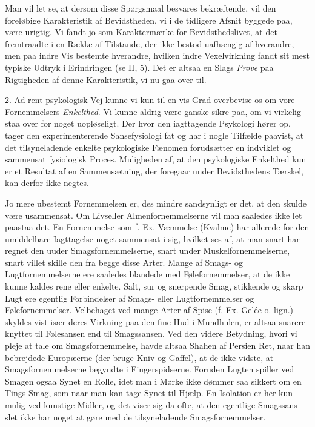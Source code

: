 \documentclass[12pt,a4paper,openany]{book}
\newcommand{\opage}[1]{\marginnote{\footnotesize\textit{[#1]}}}
\begin{document}
Man vil let se, at dersom disse Spørgsmaal besvares bekræftende, vil den
foreløbige Karakteristik af Bevidstheden, vi i de tidligere Afsnit
byggede paa, være urigtig. Vi fandt jo som Karaktermærke for
Bevidsthedslivet, at det fremtraadte i en Række af Tilstande, der ikke
bestod uafhængig af hverandre, men paa indre Vis bestemte hverandre,
hvilken indre Vexelvirkning fandt sit mest typiske Udtryk i Erindringen
(se II, 5). Det er altsaa en Slags \emph{Prøve} paa Rigtigheden af denne
Karakteristik, vi nu gaa over til.

2. Ad rent psykologisk Vej kunne vi kun til en vis Grad overbevise os om
vore Fornemmelsers \emph{Enkelthed}. Vi kunne aldrig være ganske sikre
paa, om vi virkelig staa over for noget uopløseligt. Der hvor den
iagttagende Psykologi hører op, tager den experimenterende
Sansefysiologi fat og har i nogle Tilfælde paavist, at det
tilsyneladende enkelte psykologiske Fænomen forudsætter en indviklet og
sammensat fysiologisk Proces. Muligheden af, at den psykologiske
Enkelthed kun er et Resultat af en Sammensætning, der foregaar under
Bevidsthedens Tærskel, kan derfor ikke negtes.

Jo mere ubestemt Fornemmelsen er, des mindre sandsynligt er det, at den
skulde være usammensat. Om Livseller Almenfornemmelserne vil man
saaledes ikke let paastaa det. En Fornemmelse som f. Ex. Væmmelse
(Kvalme) har allerede for den umiddelbare Iagttagelse noget sammensat i
\opage{122}sig, hvilket ses af, at man snart har regnet den uuder
Smagsfornemmelserne, snart under Muskelfornemmelserne, snart villet
skille den fra begge disse Arter. Mange af Smags- og Lugtfornemmelserne
ere saaledes blandede med Følefornemmelser, at de ikke kunne kaldes rene
eller enkelte. Salt, sur og snerpende Smag, stikkende og skarp Lugt ere
egentlig Forbindelser af Smags- eller Lugtfornemmelser og
Følefornemmelser. Velbehaget ved mange Arter af Spise (f. Ex. Gelée o.
lign.) skyldes vist især deres Virkning paa den fine Hud i Mundhulen, er
altsaa snarere knyttet til Følesansen end til Smagssansen. Ved den
videre Betydning, hvori vi pleje at tale om Smagsfornemmelse, havde
altsaa Shahen af Persien Ret, naar han bebrejdede Europæerne (der bruge
Kniv og Gaffel), at de ikke vidste, at Smagsfornemmelserne begyndte i
Fingerspidserne. Foruden Lugten spiller ved Smagen ogsaa Synet en Rolle,
idet man i Mørke ikke dømmer saa sikkert om en Tings Smag, som naar man
kan tage Synet til Hjælp. En Isolation er her kun mulig ved kunstige
Midler, og det viser sig da ofte, at den egentlige Smagssans slet ikke
har noget at gøre med de tilsyneladende Smagsfornemmelser.
\end{document}
